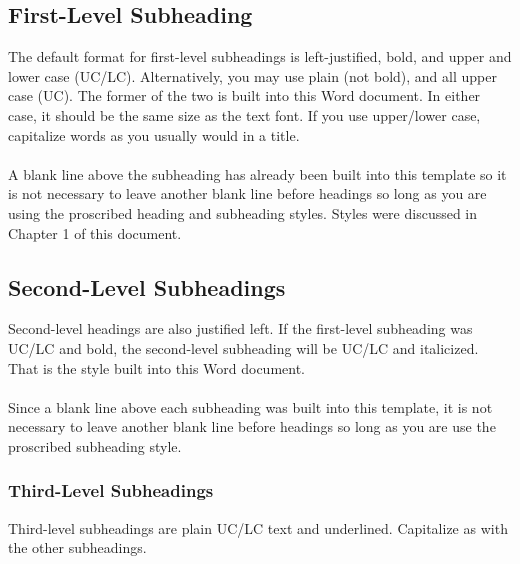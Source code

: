 \documentclass{article}
\begin{document}
\begin{justify}
\begin{appendix}
\section{First-Level Subheading}
The default format for first-level subheadings is left-justified, bold, and upper and lower case (UC/LC). Alternatively, you may use plain (not bold), and all upper case (UC).  The former of the two is built into this Word document. In either case, it should be the same size as the text font.  If you use upper/lower case, capitalize words as you usually would in a title.\\~\\
	A blank line above the subheading has already been built into this template so it is not necessary to leave another blank line before headings so long as you are using the proscribed heading and subheading styles. Styles were discussed in Chapter 1 of this document.
 \subsection{Second-Level Subheadings}
 Second-level headings are also justified left. If the first-level subheading was UC/LC and bold, the second-level subheading will be UC/LC and italicized. That is the style built into this Word document.\\~\\
	Since a blank line above each subheading was built into this template, it is not necessary to leave another blank line before headings so long as you are use the proscribed subheading style.
\subsubsection{Third-Level Subheadings}
Third-level subheadings are plain UC/LC text and underlined. Capitalize as with the other subheadings. 

\end{appendix}
\end{justify}
\end{document}
